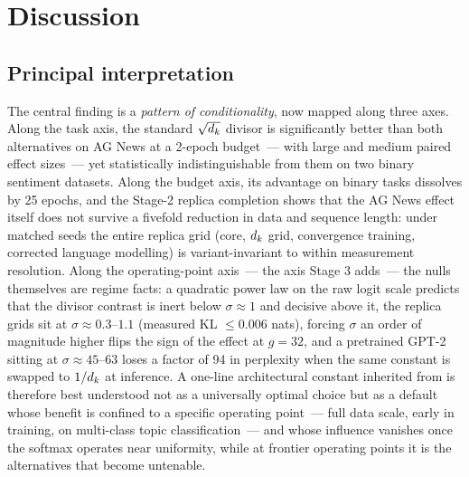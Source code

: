 \section{Discussion}\label{sec:discussion}

\subsection{Principal interpretation}\label{sec:interpretation}
The central finding is a \emph{pattern of conditionality}, now mapped along
three axes. Along the task axis, the standard $\sqrt{d_k}$ divisor is
significantly better than both alternatives on AG News at a 2-epoch budget~---
with large and medium paired effect sizes~--- yet statistically
indistinguishable from them on two binary sentiment datasets. Along the budget
axis, its advantage on binary tasks dissolves by 25 epochs, and the Stage-2
replica completion shows that the AG News effect itself does not survive a
fivefold reduction in data and sequence length: under matched seeds the entire
replica grid (core, $d_k$ grid, convergence training, corrected language
modelling) is variant-invariant to within measurement resolution. Along the
operating-point axis~--- the axis Stage 3 adds~--- the nulls themselves are
regime facts: a quadratic power law on the raw logit scale predicts that the
divisor contrast is inert below $\sigma \approx 1$ and decisive above it, the
replica grids sit at $\sigma \approx 0.3$--$1.1$ (measured KL $\le 0.006$
nats), forcing $\sigma$ an order of magnitude higher flips the sign of the
effect at $g = 32$, and a pretrained GPT-2 sitting at $\sigma \approx 45$--63
loses a factor of 94 in perplexity when the same constant is swapped to
$1/d_k$ at inference. A one-line architectural constant inherited from
\cite{vaswani2017} is therefore best understood not as a universally optimal
choice but as a default whose benefit is confined to a specific operating
point~--- full data scale, early in training, on multi-class topic
classification~--- and whose influence vanishes once the softmax operates
near uniformity, while at frontier operating points it is the alternatives
that become untenable.

